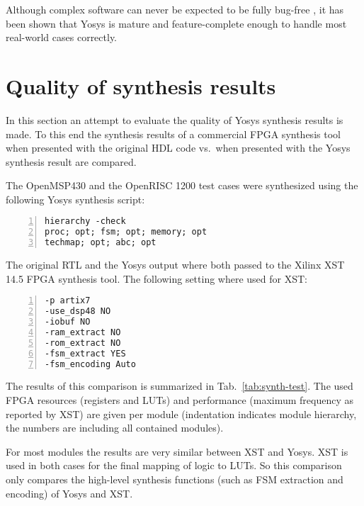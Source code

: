 Although complex software can never be expected to be fully bug-free
\cite{MURPHY}, it has been shown that Yosys is mature and feature-complete
enough to handle most real-world cases correctly.

\section{Quality of synthesis results}

In this section an attempt to evaluate the quality of Yosys synthesis results is made. To this end the
synthesis results of a commercial FPGA synthesis tool when presented with the original HDL code vs.~when
presented with the Yosys synthesis result are compared.

The OpenMSP430 and the OpenRISC 1200 test cases were synthesized using the following Yosys synthesis script:

\begin{lstlisting}[numbers=left,frame=single,mathescape]
hierarchy -check
proc; opt; fsm; opt; memory; opt
techmap; opt; abc; opt
\end{lstlisting}

The original RTL and the Yosys output where both passed to the Xilinx XST 14.5
FPGA synthesis tool. The following setting where used for XST:

\begin{lstlisting}[numbers=left,frame=single,mathescape]
-p artix7
-use_dsp48 NO
-iobuf NO
-ram_extract NO
-rom_extract NO
-fsm_extract YES
-fsm_encoding Auto
\end{lstlisting}

The results of this comparison is summarized in Tab.~\ref{tab:synth-test}. The
used FPGA resources (registers and LUTs) and performance (maximum frequency as
reported by XST) are given per module (indentation indicates module hierarchy,
the numbers are including all contained modules).

For most modules the results are very similar between XST and Yosys. XST is
used in both cases for the final mapping of logic to LUTs. So this comparison
only compares the high-level synthesis functions (such as FSM extraction and
encoding) of Yosys and XST.

